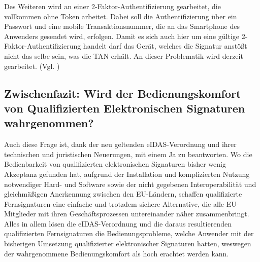 \documentclass[deutsch]{lib/llncs/llncs}
\begin{document}
Des Weiteren wird an einer 2-Faktor-Authentifizierung gearbeitet, die vollkommen ohne Token arbeitet. Dabei soll die Authentifizierung über ein Passwort und eine mobile Transaktionsnummer, die an das Smartphone des Anwenders gesendet wird, erfolgen. Damit es sich auch hier um eine gültige 2-Faktor-Authentifizierung handelt darf das Gerät, welches die Signatur anstößt nicht das selbe sein, was die TAN erhält. An dieser Problematik wird derzeit gearbeitet. (Vgl. \cite[S. 32]{Zitat08})


\subsection{Zwischenfazit: Wird der Bedienungskomfort von Qualifizierten Elektronischen Signaturen wahrgenommen?}
Auch diese Frage ist, dank der neu geltenden eIDAS-Verordnung und ihrer technischen und juristischen Neuerungen, mit einem Ja zu beantworten. Wo die Bedienbarkeit von qualifizierten elektronischen Signaturen bisher wenig Akzeptanz gefunden hat, aufgrund der Installation und komplizierten Nutzung notwendiger Hard- und Software sowie der nicht gegebenen Interoperabilität und gleichmäßigen Anerkennung zwischen den EU-Ländern, schaffen qualifizierte Fernsignaturen eine einfache und trotzdem sichere Alternative, die alle EU-Mitglieder mit ihren Geschäftsprozessen untereinander näher zusammenbringt. \\
Alles in allem lösen die eIDAS-Verordnung und die daraus resultierenden qualifizierten Fernsignaturen die Bedienungsprobleme, welche Anwender mit der bisherigen Umsetzung qualifizierter elektronischer Signaturen hatten, weswegen der wahrgenommene Bedienungskomfort als hoch erachtet werden kann.
\end{document}

